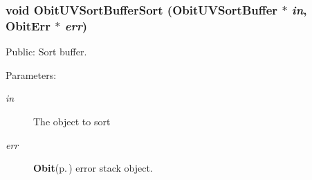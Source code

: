 \subsubsection{\setlength{\rightskip}{0pt plus 5cm}void Obit\-UVSort\-Buffer\-Sort ({\bf Obit\-UVSort\-Buffer} $\ast$ {\em in}, {\bf Obit\-Err} $\ast$ {\em err})}\label{ObitUVSortBuffer_8c_a14}


Public: Sort buffer. 

\begin{Desc}
\item[Parameters:]
\begin{description}
\item[{\em in}]The object to sort \item[{\em err}]{\bf Obit}{\rm (p.\,\pageref{structObit})} error stack object. \end{description}
\end{Desc}
